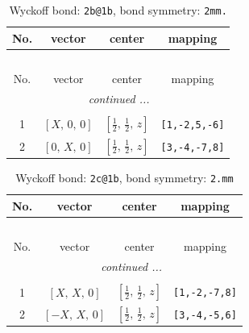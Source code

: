 \documentclass[fleqn,8pt]{jsarticle}
\begin{document}
\renewcommand{\arraystretch}{1.2}
\begin{longtable}{cccc}
\caption{Wyckoff bond: {\tt 2b@1b}, bond symmetry: {\tt 2mm.}}
 \\
 \hline \hline
No. & vector & center & mapping \\ \hline \endfirsthead

\multicolumn{3}{l}{\tablename\ \thetable{}} \\
 \hline \hline
No. & vector & center & mapping \\ \hline \endhead

 \hline \hline
\multicolumn{3}{r}{\footnotesize\it continued ...} \\ \endfoot

 \hline \hline
\multicolumn{3}{r}{} \\ \endlastfoot

1 & $\left[ X,\, 0,\, 0 \right]$ & $\left[ \frac{1}{2},\, \frac{1}{2},\, z \right]$ & {\tt [1,-2,5,-6]} \\ \hline
2 & $\left[ 0,\, X,\, 0 \right]$ & $\left[ \frac{1}{2},\, \frac{1}{2},\, z \right]$ & {\tt [3,-4,-7,8]} \\
\end{longtable}
\renewcommand{\arraystretch}{1.2}
\begin{longtable}{cccc}
\caption{Wyckoff bond: {\tt 2c@1b}, bond symmetry: {\tt 2.mm}}
 \\
 \hline \hline
No. & vector & center & mapping \\ \hline \endfirsthead

\multicolumn{3}{l}{\tablename\ \thetable{}} \\
 \hline \hline
No. & vector & center & mapping \\ \hline \endhead

 \hline \hline
\multicolumn{3}{r}{\footnotesize\it continued ...} \\ \endfoot

 \hline \hline
\multicolumn{3}{r}{} \\ \endlastfoot

1 & $\left[ X,\, X,\, 0 \right]$ & $\left[ \frac{1}{2},\, \frac{1}{2},\, z \right]$ & {\tt [1,-2,-7,8]} \\ \hline
2 & $\left[ - X,\, X,\, 0 \right]$ & $\left[ \frac{1}{2},\, \frac{1}{2},\, z \right]$ & {\tt [3,-4,-5,6]} \\
\end{longtable}
\renewcommand{\arraystretch}{1.2}
\end{document}
